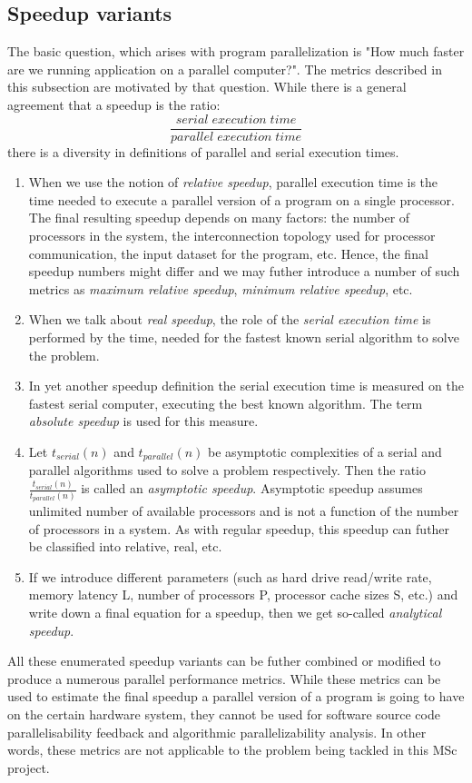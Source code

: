 \subsection{Speedup variants}
\label{background-metrics-speedup-variants}
\qquad The basic question, which arises with program parallelization is "How much faster are we running application on a parallel computer?". The metrics described in this subsection are motivated by that question. While there is a general agreement that a speedup is the ratio:
\begin{equation}
\frac{serial\; execution\; time}{parallel\; execution\; time}
\label{basic-speedup}
\end{equation}
there is a diversity in definitions of parallel and serial execution times.
\begin{enumerate}[align=left,leftmargin=*]
\item \qquad When we use the notion of \textit{relative speedup}, parallel execution time is the time needed to execute a parallel version of a program on a single processor. The final resulting speedup depends on many factors: the number of processors in the system, the interconnection topology used for processor communication, the input dataset for the program, etc. Hence, the final speedup numbers might differ and we may futher introduce a number of such metrics as \textit{maximum relative speedup}, \textit{minimum relative speedup}, etc. 
\item \qquad When we talk about \textit{real speedup}, the role of the \textit{serial execution time} is performed by the time, needed for the fastest known serial algorithm to solve the problem.   
\item \qquad In yet another speedup definition the serial execution time is measured on the fastest serial computer, executing the best known algorithm. The term \textit{absolute speedup} is used for this measure. 
\item \qquad Let $t_{serial}(n)$ and $t_{parallel}(n)$ be asymptotic complexities of a serial and parallel algorithms used to solve a problem respectively. Then the ratio $\frac{t_{serial}(n)}{t_{parallel}(n)}$ is called an \textit{asymptotic speedup}. Asymptotic speedup assumes unlimited number of available processors and is not a function of the number of processors in a system. As with regular speedup, this speedup can futher be classified into relative, real, etc.
\item \qquad If we introduce different parameters (such as hard drive read/write rate, memory latency L, number of processors P, processor cache sizes S, etc.) and write down a final equation for a speedup, then we get so-called \textit{analytical speedup}. 

\end{enumerate} 
\qquad All these enumerated speedup variants can be futher combined or modified to produce a numerous parallel performance metrics. While these metrics can be used to estimate the final speedup a parallel version of a program is going to have on the certain hardware system, they cannot be used for software source code parallelisability feedback and algorithmic parallelizability analysis. In other words, these metrics are not applicable to the problem being tackled in this MSc project.  


